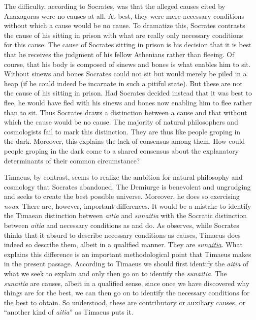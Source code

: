 The difficulty, according to Socrates, was that the alleged causes cited by Anaxagoras were no causes at all. At best, they were mere necessary conditions without which a cause would be no cause. To dramatize this, Socrates contrasts the cause of his sitting in prison with what are really only necessary conditions for this cause. The cause of Socrates sitting in prison is his decision that it is best that he receives the judgment of his fellow Athenians rather than fleeing. Of course, that his body is composed of sinews and bones is what enables him to sit. Without sinews and bones Socrates could not sit but would merely be piled in a heap (if he could indeed be incarnate in such a pitiful state). But these are not the cause of his sitting in prison. Had Socrates decided instead that it was best to flee, he would have fled with his sinews and bones now enabling him to flee rather than to sit. Thus Socrates draws a distinction between a cause and that without which the cause would be no cause. The majority of natural philosophers and cosmologists fail to mark this distinction. They are thus like people groping in the dark. Moreover, this explains the lack of consensus among them. How could people groping in the dark come to a shared consensus about the explanatory determinants of their common circumstance?

Timaeus, by contrast, seems to realize the ambition for natural philosophy and cosmology that Socrates abandoned. The Demiurge is benevolent and ungrudging and seeks to create the best possible universe. Moreover, he does so exercising \emph{nous}. There are, however, important differences. It would be a mistake to identify the Timaean distinction between \emph{aitia} and \emph{sunaitia} with the Socratic distinction between \emph{aitia} and necessary conditions as \citet[106]{Burnet:1911aa} and \citet[303]{Taylor:1928qb} do. As \citet[104]{Johansen:2004dx} observes, while Socrates thinks that it absurd to describe necessary conditions as causes, Timaeus does indeed so describe them, albeit in a qualified manner. They are \emph{sun\underline{aitia}}. What explains this difference is an important methodological point that Timaeus makes in the present passage. According to Timaeus we should first identify the \emph{aitia} of what we seek to explain and only then go on to identify the \emph{sunaitia}. The \emph{sunaitia} are causes, albeit in a qualified sense, since once we have discovered why things are for the best, we can then go on to identify the necessary conditions for the best to obtain. So understood, these are contributory or auxiliary causes, or ``another kind of \emph{aitia}'' as Timaeus puts it. 


